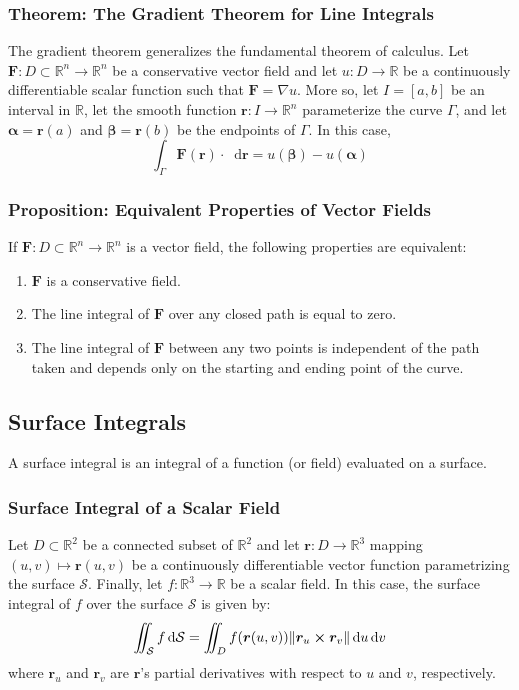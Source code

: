 \documentclass[11pt, a4paper]{article}
\newcommand{\diff}{\mathop{}\!\mathrm{d}} %
\begin{document}
\subsubsection{Theorem: The Gradient Theorem for Line Integrals}
The gradient theorem generalizes the fundamental theorem of calculus. Let $ \bm{F} :  D \subset \mathbb{R}^n \rightarrow \mathbb{R}^n $ be a conservative vector field and let $ u : D \rightarrow \mathbb{R} $ be a continuously differentiable scalar function such that $ \bm{F} = \nabla u $. More so, let $ I = [a, b] $ be an interval in $ \mathbb{R} $, let the smooth function $ \bm{r} : I\rightarrow \mathbb{R}^n $ parameterize the curve $ \Gamma $, and let $ \bm{\alpha} = \bm{r}(a) $ and $ \bm{\beta} = \bm{r}(b) $ be the endpoints of $ \Gamma $. In this case,
\begin{equation*}
	\int_\Gamma \bm{F}(\bm{r})\cdot \diff \bm{r} = u(\bm{\beta}) - u(\bm{\alpha})
\end{equation*}

\subsubsection{Proposition: Equivalent Properties of Vector Fields}
If $ \bm{F} :  D \subset \mathbb{R}^n \rightarrow \mathbb{R}^n $ is a vector field, the following properties are equivalent:
\begin{enumerate}
	\item $ \bm{F} $ is a conservative field.
	\item The line integral of $ \bm{F} $ over any closed path is equal to zero.
	\item The line integral of $ \bm{F} $ between any two points is independent of the path taken and depends only on the starting and ending point of the curve.
\end{enumerate}

\subsection{Surface Integrals}
A surface integral is an integral of a function (or field) evaluated on a surface.

\subsubsection{Surface Integral of a Scalar Field}
Let $ D \subset \mathbb{R}^2 $ be a connected subset of $ \mathbb{R}^2 $ and let $ \bm{r} : D \rightarrow \mathbb{R}^3 $ mapping $ (u, v) \mapsto \bm{r}(u, v) $ be a continuously differentiable vector function parametrizing the surface $ \mathcal{S} $. Finally, let $ f : \mathbb{R}^3 \rightarrow \mathbb{R} $ be a scalar field. In this case, the surface integral of $ f $ over the surface $ \mathcal{S} $ is given by:
\begin{equation*}
	\iint_{\mathcal{S}} f \diff \mathcal{S} = \iint_{D} f(\bm{r}(u, v)) \norm{\bm{r}_u \cross \bm{r}_v} \diff u \diff v
\end{equation*}
where $ \bm{r}_u $ and $ \bm{r}_v $ are $ \bm{r} $'s partial derivatives with respect to $ u $ and $ v $, respectively.
	
\end{document}

